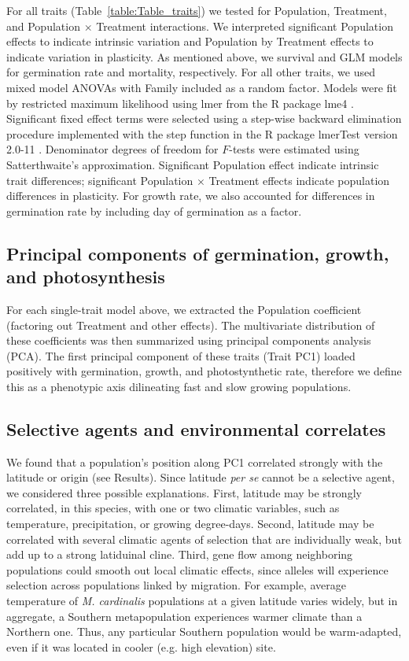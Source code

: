 \documentclass[11pt, oneside]{article}
\newcommand{\pkg}[1]{{\fontseries{b}\selectfont #1}}
\begin{document}
For all traits (Table~\ref{table:Table_traits}) we tested for Population, Treatment, and Population $\times$ Treatment interactions. We interpreted significant Population effects to indicate intrinsic variation and Population by Treatment effects to indicate variation in plasticity. As mentioned above, we survival and GLM models for germination rate and mortality, respectively. For all other traits, we used mixed model ANOVAs with Family included as a random factor. Models were fit by restricted maximum likelihood using lmer from the R package \pkg{lme4} \citep{Bates_etal_2014}. Significant fixed effect terms were selected using a step-wise backward elimination procedure implemented with the step function in the R package \pkg{lmerTest} version 2.0-11 \citep{Kuznetsova_etal_2014}. Denominator degrees of freedom for $F$-tests were estimated using Satterthwaite's approximation. Significant Population effect indicate intrinsic trait differences; significant Population $\times$ Treatment effects indicate population differences in plasticity. For growth rate, we also accounted for differences in germination rate by including day of germination as a factor.

\subsection*{Principal components of germination, growth, and photosynthesis}
For each single-trait model above, we extracted the Population coefficient (factoring out Treatment and other effects). The multivariate distribution of these coefficients was then summarized using principal components analysis (PCA). The first principal component of these traits (Trait PC1) loaded positively with germination, growth, and photostynthetic rate, therefore we define this as a phenotypic axis dilineating fast and slow growing populations.



\subsection*{Selective agents and environmental correlates}

We found that a population's position along PC1 correlated strongly with the latitude or origin (see Results). Since latitude \textit{per se} cannot be a selective agent, we considered three possible explanations. First, latitude may be strongly correlated, in this species, with one or two climatic variables, such as temperature, precipitation, or growing degree-days. Second, latitude may be correlated with several climatic agents of selection that are individually weak, but add up to a strong latiduinal cline. Third, gene flow among neighboring populations could smooth out local climatic effects, since alleles will experience selection across populations linked by migration. For example, average temperature of \textit{M. cardinalis} populations at a given latitude varies widely, but in aggregate, a Southern metapopulation experiences warmer climate than a Northern one. Thus, any particular Southern population would be warm-adapted, even if it was located in cooler (e.g. high elevation) site. 
\end{document}
